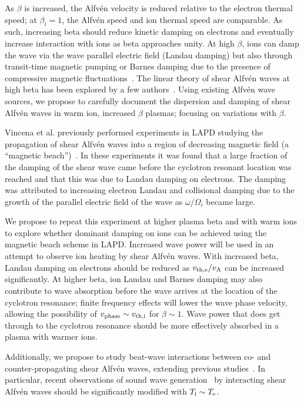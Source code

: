 \documentclass[11pt]{article}
\newcommand\Alfven{Alfv\'en }
\renewcommand{\cite}{\citep}
\begin{document}
As $\beta$ is increased, the Alfv\'{e}n velocity is reduced relative
to the electron thermal speed; at $\beta_i = 1$, the Alfv\'{e}n speed
and ion thermal speed are comparable.  As such, increasing beta should
reduce kinetic damping on electrons and eventually increase
interaction with ions as beta approaches unity.  At high $\beta$, ions
can damp the wave via the wave parallel electric field (Landau
damping) but also through transit-time magnetic pumping or Barnes
damping due to the presence of compressive magnetic
fluctuations~\cite{barnes66, hollweg71}.  The linear theory of shear
Alfv\'{e}n waves at high beta has been explored by a few
authors~\cite{schekochihin09, boldyrev13}. Using existing \Alfven wave
sources, we propose to carefully document the dispersion and damping
of shear \Alfven waves in warm ion, increased $\beta$ plasmas;
focusing on variations with $\beta$.

Vincena et al. previously performed experiments in LAPD studying the
propagation of shear Alfv\'{e}n waves into a region of decreasing
magnetic field (a ``magnetic beach'')~\cite{vincena01}.   In these
experiments it was
found that a large fraction of the damping of the shear wave came
before the cyclotron resonant location was reached and that this was
due to Landau damping on
electrons. The damping was attributed to increasing electron Landau
and collisional damping due to the growth of the parallel electric
field of the wave as $\omega/\Omega_i$ became large.

We propose to repeat this experiment at higher plasma beta and with
warm ions to explore whether dominant damping on ions can be achieved
using the magnetic beach scheme in LAPD. Increased wave power will be
used in an attempt to observe ion heating by shear Alfv\'{e}n
waves. With increased beta, Landau damping on electrons should be
reduced as $v_{\rm th,e}/v_{\rm A}$ can be increased significantly. At higher
beta, ion Landau and Barnes damping may also contribute to wave
absorption before the wave arrives at the location of the cyclotron resonance; finite
frequency effects will lower the wave phase velocity, allowing the
possibility of $v_{\rm phase} \sim v_{\rm th,i}$ for $\beta \sim 1$.  Wave power
that does get through to the cyclotron resonance should be more
effectively absorbed in a plasma with warmer ions.

Additionally, we propose to study beat-wave interactions between co-
and counter-propagating shear Alfv\'{e}n waves, extending previous
studies~\cite{carter:2006,auerbach:2010,auerbach:2011,dorfman:2013,dorfman:2015}.
In particular, recent observations of sound wave generation~\cite{dorfman:2013,dorfman:2015} by
interacting shear Alfv\'{e}n waves should be significantly modified
with $T_{\rm i} \sim T_{\rm e}$.
\end{document}
